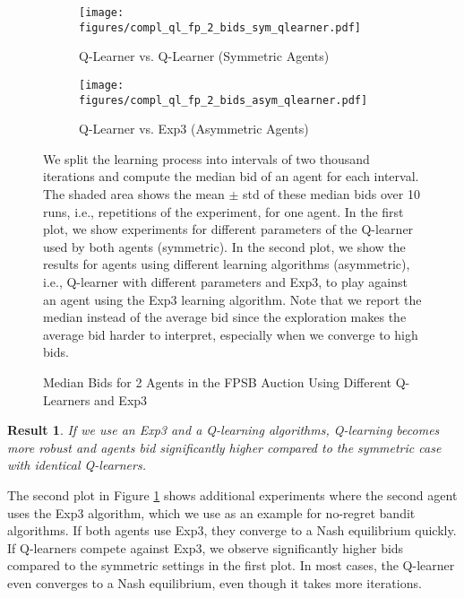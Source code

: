 \documentclass{article}
\newtheorem{result}{Result}
\begin{document}
\begin{figure}[h]
	\begin{center}
	\begin{subfigure}{0.45\textwidth}
		\centering
		\texttt{[image: figures/compl\_ql\_fp\_2\_bids\_sym\_qlearner.pdf]}
		\caption{Q-Learner vs. Q-Learner (Symmetric Agents)}
	\end{subfigure}
	\begin{subfigure}{0.45\textwidth}
		\centering
		\texttt{[image: figures/compl\_ql\_fp\_2\_bids\_asym\_qlearner.pdf]}
		\caption{Q-Learner vs. Exp3 (Asymmetric Agents)}
	\end{subfigure}
	\caption{Median Bids for 2 Agents in the FPSB Auction Using Different Q-Learners and Exp3}
	\label{fig:q_learner}
	\end{center}
	\footnotesize We split the learning process into intervals of two thousand iterations and compute the median bid of an agent for each interval. The shaded area shows the mean $ \pm $ std of these median bids over 10 runs, i.e., repetitions of the experiment, for one agent. In the first plot, we show experiments for different parameters of the Q-learner used by both agents (symmetric). In the second plot, we show the results for agents using different learning algorithms (asymmetric), i.e., Q-learner with different parameters and Exp3, to play against an agent using the Exp3 learning algorithm. Note that we report the median instead of the average bid since the exploration makes the average bid harder to interpret, especially when we converge to high bids.
\end{figure}

\begin{result}
	If we use an Exp3 and a Q-learning algorithms, Q-learning becomes more robust and agents bid significantly higher compared to the symmetric case with identical Q-learners.
\end{result}

The second plot in Figure \ref{fig:q_learner} shows additional experiments where the second agent uses the Exp3 algorithm, which we use as an example for no-regret bandit algorithms. If both agents use Exp3, they converge to a Nash equilibrium quickly. If Q-learners compete against Exp3, we observe significantly higher bids compared to the symmetric settings in the first plot. In most cases, the Q-learner even converges to a Nash equilibrium, even though it takes more iterations.
\end{document}
